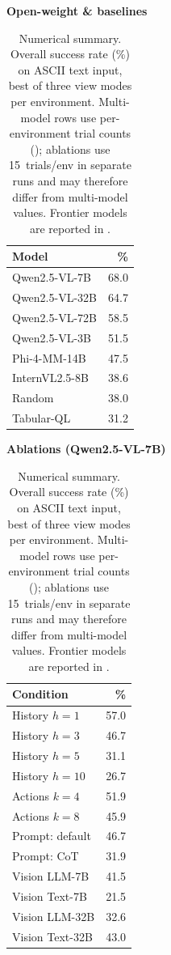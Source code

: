 \documentclass[letterpaper]{article}
\begin{document}
\begin{table}[t]
\centering
\caption{Numerical summary. Overall success rate (\%) on ASCII text input, best of three view modes per environment. Multi-model rows use per-environment trial counts (); ablations use 15~trials/env in separate runs and may therefore differ from multi-model values. Frontier models are reported in .}
\label{tab:summary}
\begin{minipage}[t]{0.48\columnwidth}
\centering
\footnotesize
\textbf{Open-weight \& baselines}\\[2pt]
\begin{tabular}{@{}lr@{}}
\toprule
Model & \% \\
\midrule
Qwen2.5-VL-7B  & 68.0 \\
Qwen2.5-VL-32B & 64.7 \\
Qwen2.5-VL-72B & 58.5 \\
Qwen2.5-VL-3B  & 51.5 \\
Phi-4-MM-14B   & 47.5 \\
InternVL2.5-8B & 38.6 \\
Random         & 38.0 \\
Tabular-QL     & 31.2 \\
\bottomrule
\end{tabular}
\end{minipage}\hfill
\begin{minipage}[t]{0.48\columnwidth}
\centering
\footnotesize
\textbf{Ablations (Qwen2.5-VL-7B)}\\[2pt]
\begin{tabular}{@{}lr@{}}
\toprule
Condition & \% \\
\midrule
History $h{=}1$    & 57.0 \\
History $h{=}3$    & 46.7 \\
History $h{=}5$    & 31.1 \\
History $h{=}10$   & 26.7 \\
Actions $k{=}4$    & 51.9 \\
Actions $k{=}8$    & 45.9 \\
Prompt: default   & 46.7 \\
Prompt: CoT       & 31.9 \\
Vision LLM-7B     & 41.5 \\
Vision Text-7B    & 21.5 \\
Vision LLM-32B    & 32.6 \\
Vision Text-32B   & 43.0 \\
\bottomrule
\end{tabular}
\end{minipage}
\end{table}
\end{document}
